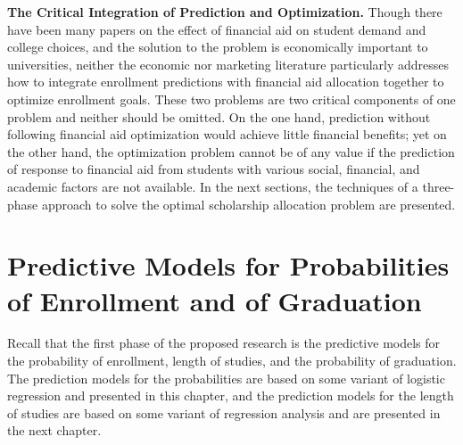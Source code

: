 \documentclass[12pt,english]{report}
\begin{document}



\vspace{0.15in}
\noindent \textbf{The Critical Integration of Prediction and Optimization.} Though there have been many papers on the effect of financial aid on student demand and college choices, and the solution to the problem is economically important to universities, neither the economic nor marketing literature particularly addresses how to integrate enrollment predictions with financial aid allocation together to optimize enrollment goals.  These two problems are two critical components of one problem and neither should be omitted. On the one hand, prediction without following financial aid optimization would achieve little financial benefits; yet on the other hand, the optimization problem cannot be of any value if the prediction of response to financial aid from students with various social, financial, and academic factors are not available.  In the next sections, the techniques of a three-phase approach to solve the optimal scholarship allocation problem are presented.

\chapter{Predictive Models for Probabilities of Enrollment and of Graduation}
Recall that the first phase of the proposed research is the predictive models for the probability of enrollment, length of studies, and the probability of graduation. The prediction models for the probabilities are based on some variant of logistic regression and presented in this chapter, and the prediction models for the length of studies are based on some variant of regression analysis and are presented in the next chapter. 
\end{document}
